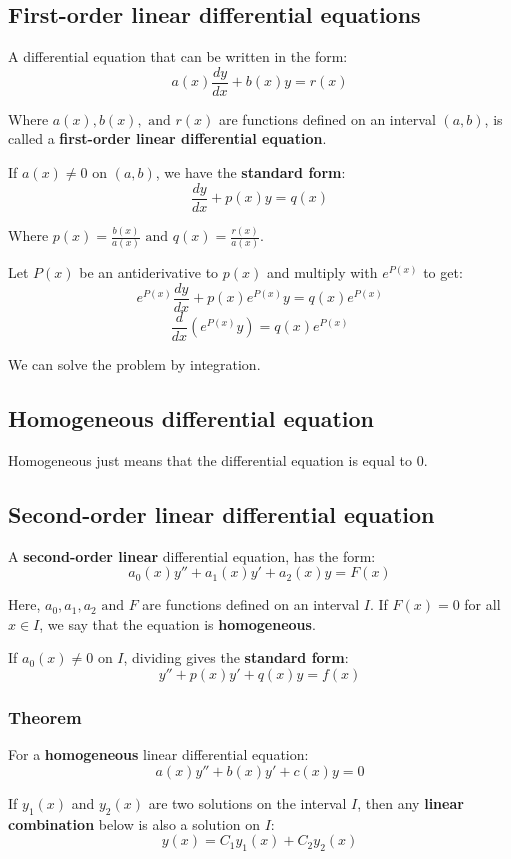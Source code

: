 \documentclass[11pt]{article}
\begin{document}
\newpage
\subsection{First-order linear differential equations}
\label{sec:org3005e13}
A differential equation that can be written in the form:
\[a(x) \frac{dy}{dx} + b(x)y = r(x)\]

Where \(a(x), b(x), \text{ and } r(x)\) are functions defined on an interval \((a, b)\), is called a \textbf{first-order linear differential equation}.


If \(a(x) \ne 0\) on \((a, b)\), we have the \textbf{standard form}:
\[\frac{dy}{dx} + p(x) y = q(x)\]

Where \(p(x) = \frac{b(x)}{a(x)} \text{ and } q(x) = \frac{r(x)}{a(x)}\).


Let \(P(x)\) be an antiderivative to \(p(x)\) and multiply with \(e^{P(x)}\) to get:
\[e^{P(x)} \frac{dy}{dx} + p(x) e^{P(x)} y = q(x) e^{P(x)}\]
\[\frac{d}{dx} \left( e^{P(x)} y \right) = q(x) e^{P(x)}\]

We can solve the problem by integration.
\subsection{Homogeneous differential equation}
\label{sec:org2690fb5}
Homogeneous just means that the differential equation is equal to 0.

\newpage
\subsection{Second-order linear differential equation}
\label{sec:org12f37ed}
A \textbf{second-order linear} differential equation, has the form:
\[a_0(x)y'' + a_1(x)y' + a_2(x)y = F(x)\]

Here, \(a_0, a_1, a_2 \text{ and } F\) are functions defined on an interval \(I\). If \(F(x) = 0\) for all \(x \in I\), we say that the equation is \textbf{homogeneous}.


If \(a_0 (x) \ne 0\) on \(I\), dividing gives the \textbf{standard form}:
\[y'' + p(x)y' + q(x)y = f(x)\]
\subsubsection{Theorem}
\label{sec:orga06f90a}
For a \textbf{homogeneous} linear differential equation:
\[a(x)y'' + b(x)y' + c(x)y = 0\]

If \(y_1(x)\) and \(y_2(x)\) are two solutions on the interval \(I\), then any \textbf{linear combination} below is also a solution on \(I\):
\[y(x) = C_1 y_1 (x) + C_2 y_2 (x)\]
\end{document}
